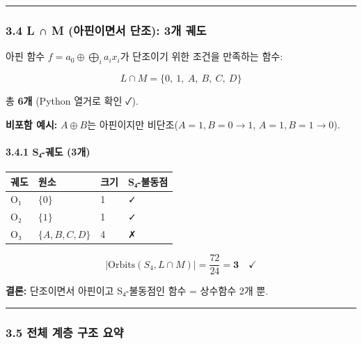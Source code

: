 \documentclass[
]{article}
\newcounter{none} %
\begin{document}
\begin{center}\rule{0.5\linewidth}{0.5pt}\end{center}

\subsubsection{3.4 L ∩ M (아핀이면서 단조): 3개
궤도}\label{l-m-uxc544uxd540uxc774uxba74uxc11c-uxb2e8uxc870-3uxac1c-uxada4uxb3c4}

아핀 함수 \(f = a_0 \oplus \bigoplus_i a_i x_i\)가 단조이기 위한 조건을
만족하는 함수:

\[L \cap M = \{0,\ 1,\ A,\ B,\ C,\ D\}\]

총 \textbf{6개} (Python 열거로 확인 ✓).

\textbf{비포함 예시:} \(A \oplus B\)는 아핀이지만
비단조(\(A=1,B=0 \to 1\), \(A=1,B=1 \to 0\)).

\paragraph{3.4.1 S₄-궤도 (3개)}\label{sux2084-uxada4uxb3c4-3uxac1c}

{\def\LTcaptype{none} %
\begin{longtable}[]{@{}llll@{}}
\toprule\noalign{}
궤도 & 원소 & 크기 & S₄-불동점 \\
\midrule\noalign{}
\endhead
\bottomrule\noalign{}
\endlastfoot
O₁ & \(\{0\}\) & 1 & ✓ \\
O₂ & \(\{1\}\) & 1 & ✓ \\
O₃ & \(\{A, B, C, D\}\) & 4 & ✗ \\
\end{longtable}
}

\[|\text{Orbits}(S_4, L \cap M)| = \frac{72}{24} = \mathbf{3} \quad \checkmark\]

\textbf{결론:} 단조이면서 아핀이고 S₄-불동점인 함수 = 상수함수 2개 뿐.

\begin{center}\rule{0.5\linewidth}{0.5pt}\end{center}

\subsubsection{3.5 전체 계층 구조
요약}\label{uxc804uxccb4-uxacc4uxce35-uxad6cuxc870-uxc694uxc57d}
\end{document}
